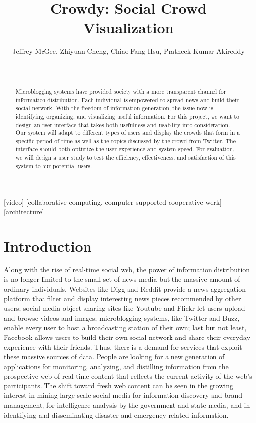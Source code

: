 \documentclass{sig-alternate}
\title{Crowdy: Social Crowd Visualization}
\author{
    \alignauthor Jeffrey McGee, Zhiyuan Cheng, Chiao-Fang Hsu, Pratheek
    Kumar Akireddy \\
    \affaddr{Department of Computer Science and Engineering, Texas A\&M
    University} \\
    \affaddr{ College Station, TX 77845 USA} \\
    \email{jeffamcgee@gmail.com, zcheng@cse.tamu.edu, drakihsu@cse.tamu.edu,
    pka293@cse.tamu.edu}
}
\begin{document}
\maketitle
\begin{abstract}
Microblogging systems have provided society with a more transparent channel
for information distribution. Each individual is empowered to spread news
and build their social network. With the freedom of information generation,
the issue now is identifying, organizing, and visualizing useful information.
For this project, we want to design an user interface that takes
both usefulness and usability into consideration. Our system will
adapt to different types of users and display the crowds that form in a specific
period of time as well as the topics discussed by the crowd from Twitter. The
interface should both optimize the user experience and system speed. For
evaluation, we will design a user study to
test the efficiency, effectiveness, and satisfaction of this system to our
potential users.
\end{abstract}

[video]
[collaborative computing,
computer-supported cooperative work]
[architecture]



\section{Introduction}
Along with the rise of real-time social web, the power of information
distribution is no longer limited to the small set of news media but the
massive amount of ordinary individuals. Websites like Digg and Reddit provide
a news aggregation platform that filter and display interesting news pieces
recommended by other users; social media object sharing sites like Youtube and
Flickr let users upload and browse videos and images; microblogging systems,
like Twitter and Buzz, enable every user to host a broadcasting station of
their own; last but not least, Facebook allows users to build their own
social network and share their everyday experience with their friends.
Thus, there is a demand for services that
exploit these massive sources of data. People are looking for a new
generation of applications for monitoring, analyzing, and distilling
information from the prospective web of real-time content that reflects the
current activity of the web's participants. The shift toward fresh web content
can be seen in the growing interest in mining large-scale social media for
information discovery and brand management, for intelligence analysis by the
government and state media, and in identifying and disseminating disaster and
emergency-related information.
\end{document}
